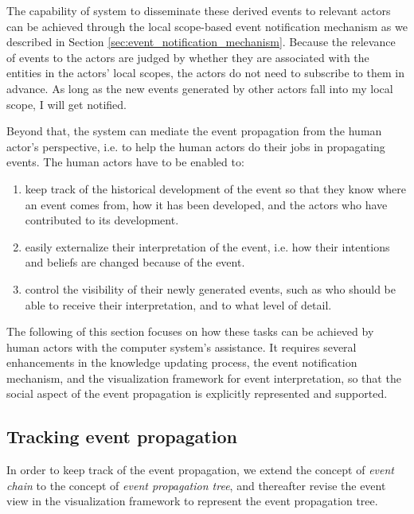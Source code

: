 The capability of system to disseminate these derived events to relevant actors can be achieved through the local scope-based event notification mechanism as we described in Section \ref{sec:event_notification_mechanism}. Because the relevance of events to the actors are judged by whether they are associated with the entities in the actors' local scopes, the actors do not need to subscribe to them in advance. As long as the new events generated by other actors fall into my local scope, I will get notified.  


Beyond that, the system can mediate the event propagation from the human actor's perspective, i.e. to help the human actors do their jobs in propagating events. The human actors have to be enabled to:

\begin{enumerate}
	\item keep track of the historical development of the event so that they know where an event comes from, how it has been developed, and the actors who have contributed to its development.
	\item easily externalize their interpretation of the event, i.e. how their intentions and beliefs are changed because of the event.
	\item control the visibility of their newly generated events, such as who should be able to receive their interpretation, and to what level of detail.
\end{enumerate}

The following of this section focuses on how these tasks can be achieved by human actors with the computer system's assistance. It requires several enhancements in the knowledge updating process, the event notification mechanism, and the visualization framework for event interpretation, so that the social aspect of the event propagation is explicitly represented and supported.

\subsection{Tracking event propagation} %
\label{sub:tracking_event_propagation}
In order to keep track of the event propagation, we extend the concept of \emph{event chain} to the concept of \emph{event propagation tree}, and thereafter revise the event view in the visualization framework to represent the event propagation tree. 

